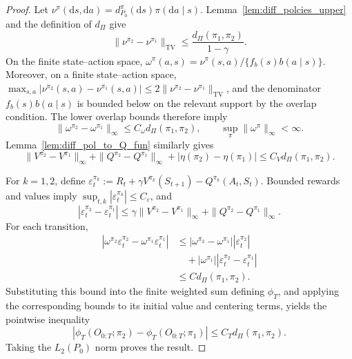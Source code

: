 \documentclass[12pt]{article}
\theoremstyle{remark}\newtheorem{remark}[theorem]{Remark}\theoremstyle{plain}
\begin{document}
\begin{proof}
    Let
    $\nu^\pi(\mathrm ds,\mathrm da)
      =d_{P_0}^\pi(\mathrm ds)\pi(\mathrm da\mid s)$.
    Lemma~\ref{lem:diff_polcies_upper} and the definition of
    $d_\Pi$ give
    \[
        \|\nu^{\pi_2}-\nu^{\pi_1}\|_{\mathrm{TV}}
        \leq\frac{d_\Pi(\pi_1,\pi_2)}{1-\gamma}.
    \]
    On the finite state--action space,
    $\omega^\pi(a,s)
      =\nu^\pi(s,a)/\{f_b(s)b(a\mid s)\}$.  Moreover, on a finite
    state--action space,
    $\max_{s,a}|\nu^{\pi_2}(s,a)-\nu^{\pi_1}(s,a)|
    \leq 2\|\nu^{\pi_2}-\nu^{\pi_1}\|_{\mathrm{TV}}$, and the
    denominator $f_b(s)b(a\mid s)$ is bounded below on the relevant
    support by the overlap condition.
    The lower overlap bounds therefore imply
    \[
        \|\omega^{\pi_2}-\omega^{\pi_1}\|_\infty
        \leq C_\omega d_\Pi(\pi_1,\pi_2),
        \qquad
        \sup_{\pi}\|\omega^\pi\|_\infty<\infty.
    \]
    Lemma~\ref{lem:diff_pol_to_Q_fun} similarly gives
    \[
        \|V^{\pi_2}-V^{\pi_1}\|_\infty
        +\|Q^{\pi_2}-Q^{\pi_1}\|_\infty
        +|\eta(\pi_2)-\eta(\pi_1)|
        \leq C_Vd_\Pi(\pi_1,\pi_2).
    \]

    For $k=1,2$, define
    $\varepsilon_t^{\pi_k}
      :=R_t+\gamma V^{\pi_k}(S_{t+1})
        -Q^{\pi_k}(A_t,S_t)$.
    Bounded rewards and values imply
    $\sup_{t,k}|\varepsilon_t^{\pi_k}|\leq C_\varepsilon$, and
    \[
        |\varepsilon_t^{\pi_2}
          -\varepsilon_t^{\pi_1}|
        \leq
        \gamma\|V^{\pi_2}-V^{\pi_1}\|_\infty
        +\|Q^{\pi_2}-Q^{\pi_1}\|_\infty.
    \]
    For each transition,
    \[
        \begin{aligned}
        |\omega^{\pi_2}\varepsilon_t^{\pi_2}
          -\omega^{\pi_1}\varepsilon_t^{\pi_1}|
        &\leq
        |\omega^{\pi_2}-\omega^{\pi_1}|
        |\varepsilon_t^{\pi_2}|\\
        &\quad+
        |\omega^{\pi_1}|
        |\varepsilon_t^{\pi_2}-\varepsilon_t^{\pi_1}|\\
        &\leq C d_\Pi(\pi_1,\pi_2).
        \end{aligned}
    \]
    Substituting this bound into the finite weighted sum defining
    $\phi_T$, and applying the corresponding bounds to its initial
    value and centering terms, yields the pointwise inequality
    \[
        |\phi_T(O_{0:T};\pi_2)-\phi_T(O_{0:T};\pi_1)|
        \leq C_Td_\Pi(\pi_1,\pi_2).
    \]
    Taking the $L_2(P_0)$ norm proves the result.
\end{proof}
\end{document}
